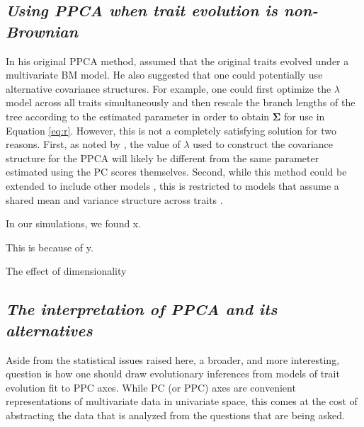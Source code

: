 \documentclass[a4paper,12pt]{article}
\begin{document}
\subsection{\emph{Using PPCA when trait evolution is non-Brownian}}
In his original PPCA method, \citet{Revell2008} assumed that the original traits evolved under a multivariate BM model. He also suggested that one could potentially use alternative covariance structures. For example, one could first optimize the $\lambda$ model \citep{Pagel1999} across all traits simultaneously \citep[using the method of][]{Freckleton2002} and then rescale the branch lengths of the tree according to the estimated parameter in order to obtain $\mathbf{\Sigma}$ for use in Equation \ref{eq:r}. However, this is not a completely satisfying solution for two reasons. First, as noted by \citet{Revell2008}, the value of $\lambda$ used to construct the covariance structure for the PPCA will likely be different from the same parameter estimated using the PC scores themselves. Second, while this method could be extended to include other models \citep{ButlerKing2009, motmot}, this is restricted to models that assume a shared mean and variance structure across traits \citep[see][for examples where this does not  apply]{Hansen2008, Bartoszek2013}.

In our simulations, we found x.

This is because of y.

The effect of dimensionality

\subsection{\emph{The interpretation of PPCA and its alternatives}}

Aside from the statistical issues raised here, a broader, and more interesting, question is how one should draw evolutionary inferences from models of trait evolution fit to PPC axes. While PC (or PPC) axes are convenient representations of multivariate data in univariate space, this comes at the cost of abstracting the data that is analyzed from the questions that are being asked. 
\end{document}
